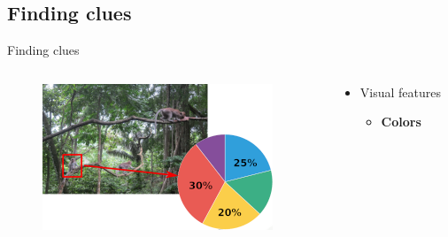 \documentclass{beamer}[10pt, usepdftitle=false, handout]
\begin{document}
	\subsection{Finding clues}
    \begin{frame}

	Finding clues
	\vspace*{1.0em}	
	
\begin{columns}
\begin{column}{0.5\textwidth}
	\begin{figure}
		\includegraphics[scale=0.6]{monkey-5.png} 
	\end{figure}	 
\end{column}
\begin{column}{0.5\textwidth}  %
    \begin{center}
	\begin{itemize}
	\item{Visual features
		\begin{itemize}
		\item{\textbf{Colors}}
		\end{itemize}			
	}
	\end{itemize}	     
     
     \end{center}
	\end{column}
	\end{columns}	
				
    \end{frame}
	
\end{document}
